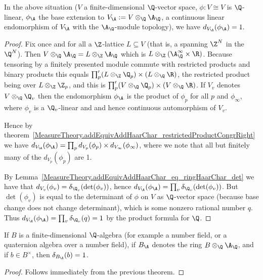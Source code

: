   \begin{theorem}
    \label{MeasureTheory.addHaarScalarFactor_tensor_adeles_eq_one}
    In the above situation ($V$ a finite-dimensional $\Q$-vector space, $\phi:V\cong V$ is
    $\Q$-linear, $\phi_{\A}$ the base extension to $V_{\A}:=V\otimes_{\Q}{\A_{\Q}}$, a continuous linear
    endomorphism of $V_{\A}$ with the $\A_{\Q}$-module topology), we have $d_{V_{\A}}(\phi_{\A})=1.$
  \end{theorem}
  \begin{proof}
    Fix once and for all a $\Z$-lattice $L\subseteq V$
    (that is, a spanning $\Z^N$ in the $\Q^N$). Then $V\otimes_{\Q}\A_{\Q}=L\otimes_{\Z}\A_{\Q}$
    which is $L\otimes_{\Z}(\A_{\Q}^\infty\times\R)$.
    Because tensoring by a finitely presented module commute with restricted products and binary
    products this equals $\prod'_p(L\otimes_{\Z}\Q_p)\times(L\otimes_{\Q}\R)$, the restricted
    product being over $L\otimes_{\Z}\Z_p$, and this is $\prod'_p(V\otimes_{\Q}\Q_p)\times(V\otimes_{\Q}\R)$.
    If $V_v$ denotes $V\otimes_{\Q}\Q_v$ then the endomorphism $\phi_{\A}$ is the product of
    $\phi_p$ for all $p$ and $\phi_\infty$,
    where $\phi_v$ is a $\Q_v$-linear and and hence continuous automorphism of $V_v$.

    Hence by theorem~\ref{MeasureTheory.addEquivAddHaarChar_restrictedProductCongrRight}
    we have $d_{V_{\A}}(\phi_{\A})=\prod_p d_{V_p}(\phi_p)\times d_{V_\infty}(\phi_\infty)$,
    where we note that all but finitely many of the $d_{V_p}(\phi_p)$ are 1.

    By Lemma~\ref{MeasureTheory.addEquivAddHaarChar_eq_ringHaarChar_det} we have that
    $d_{V_v}(\phi_v)=\delta_{\Q_v}(\det(\phi_v))$, hence $d_{V_{\A}}(\phi_{\A})=\prod_v\delta_{\Q_v}(\det(\phi_v))$.
    But $\det(\phi_v)$ is equal to the determinant of $\phi$ on $V$ as $\Q$-vector space (because
    base change does not change determinant),
    which is some nonzero rational number $q$. Thus $d_{V_{\A}}(\phi_{\A})=\prod_v\delta_{\Q_v}(q)=1$
    by the product formula for $\Q$.
  \end{proof}

  \begin{corollary}
    \label{NumberField.AdeleRing.units_mem_ringHaarCharacter_ker}
    If $B$ is a finite-dimensional $\Q$-algebra (for example a number field, or a quaternion algebra over a number field),
    if $B_{\A}$ denotes the ring $B\otimes_{\Q}\A_{\Q}$, and if $b\in B^\times$,
    then $\delta_{B_{\A}}(b)=1$.
  \end{corollary}
  \begin{proof}
    Follows immediately from the previous theorem.
  \end{proof}

